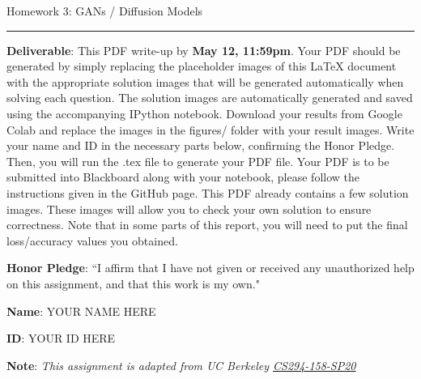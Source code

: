 \documentclass{article}
\newcommand{\ruleskip}{\bigskip\hrule\bigskip}
\begin{document}
\pagestyle{myheadings} 

{\huge
\noindent Homework 3: GANs / Diffusion Models}
\ruleskip

{\bf Deliverable}: This PDF write-up by {\bf May 12, 11:59pm}.  Your PDF should be generated by simply replacing the placeholder images of this LaTeX document with the appropriate solution images that will be generated automatically when solving each question. The solution images are automatically generated and saved using the accompanying IPython notebook.  Download your results from Google Colab and replace the images in the figures/ folder with your result images. Write your name and ID in the necessary parts below, confirming the Honor Pledge. Then, you will run the .tex file to generate your PDF file. Your PDF is to be submitted into Blackboard along with your notebook, please follow the instructions given in the GitHub page. This PDF already contains a few solution images.  These images will allow you to check your own solution to ensure correctness. Note that in some parts of this report, you will need to put the final loss/accuracy values you obtained.

{\bf Honor Pledge}: ``I affirm that I have not given or received any unauthorized help on this assignment, and that this work is my own."

{\bf Name}: YOUR NAME HERE

{\bf ID}: YOUR ID HERE

\vspace{.1in}

{\bf Note}: \textit{This assignment is adapted from UC Berkeley \href{https://sites.google.com/view/berkeley-cs294-158-sp20/home}{CS294-158-SP20}}
\vspace{.2in}

\end{document}
